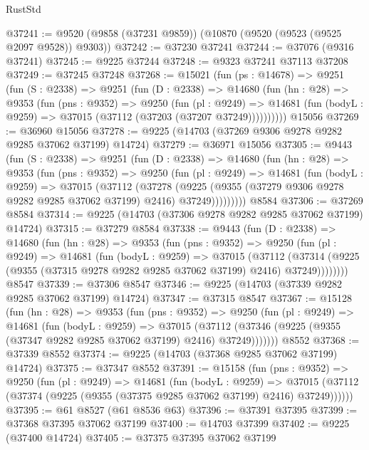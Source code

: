 \begin{lexlean}{RustStd}
\begin{coremodule}
@37241 := @9520 (@9858 (@37231 @9859)) (@10870 (@9520 (@9523 (@9525 @2097 @9528)) @9303))
@37242 := @37230 @37241
@37244 := @37076 (@9316 @37241)
@37245 := @9225 @37244
@37248 := @9323 @37241 @37113 @37208
@37249 := @37245 @37248
@37268 := @15021
    (fun (ps : @14678) =>
    @9251
      (fun (S : @2338) =>
      @9251
        (fun (D : @2338) =>
        @14680
          (fun (hn : @28) =>
          @9353
            (fun (pns : @9352) =>
            @9250
              (fun (pl : @9249) =>
              @14681 (fun (bodyL : @9259) => @37015 (@37112 (@37203 (@37207 @37249))))))))))
    @15056
@37269 := @36960 @15056
@37278 := @9225 (@14703 (@37269 @9306 @9278 @9282 @9285 @37062 @37199) @14724)
@37279 := @36971 @15056
@37305 := @9443
    (fun (S : @2338) =>
    @9251
      (fun (D : @2338) =>
      @14680
        (fun (hn : @28) =>
        @9353
          (fun (pns : @9352) =>
          @9250
            (fun (pl : @9249) =>
            @14681
              (fun (bodyL : @9259) =>
              @37015
                (@37112
                  (@37278
                    (@9225
                      (@9355 (@37279 @9306 @9278 @9282 @9285 @37062 @37199) @2416)
                      @37249)))))))))
    @8584
@37306 := @37269 @8584
@37314 := @9225 (@14703 (@37306 @9278 @9282 @9285 @37062 @37199) @14724)
@37315 := @37279 @8584
@37338 := @9443
    (fun (D : @2338) =>
    @14680
      (fun (hn : @28) =>
      @9353
        (fun (pns : @9352) =>
        @9250
          (fun (pl : @9249) =>
          @14681
            (fun (bodyL : @9259) =>
            @37015
              (@37112
                (@37314 (@9225 (@9355 (@37315 @9278 @9282 @9285 @37062 @37199) @2416) @37249))))))))
    @8547
@37339 := @37306 @8547
@37346 := @9225 (@14703 (@37339 @9282 @9285 @37062 @37199) @14724)
@37347 := @37315 @8547
@37367 := @15128
    (fun (hn : @28) =>
    @9353
      (fun (pns : @9352) =>
      @9250
        (fun (pl : @9249) =>
        @14681
          (fun (bodyL : @9259) =>
          @37015
            (@37112 (@37346 (@9225 (@9355 (@37347 @9282 @9285 @37062 @37199) @2416) @37249)))))))
    @8552
@37368 := @37339 @8552
@37374 := @9225 (@14703 (@37368 @9285 @37062 @37199) @14724)
@37375 := @37347 @8552
@37391 := @15158
    (fun (pns : @9352) =>
    @9250
      (fun (pl : @9249) =>
      @14681
        (fun (bodyL : @9259) =>
        @37015 (@37112 (@37374 (@9225 (@9355 (@37375 @9285 @37062 @37199) @2416) @37249))))))
@37395 := @61 @8527 (@61 @8536 @63)
@37396 := @37391 @37395
@37399 := @37368 @37395 @37062 @37199
@37400 := @14703 @37399
@37402 := @9225 (@37400 @14724)
@37405 := @37375 @37395 @37062 @37199

\end{coremodule}
\end{lexlean}
